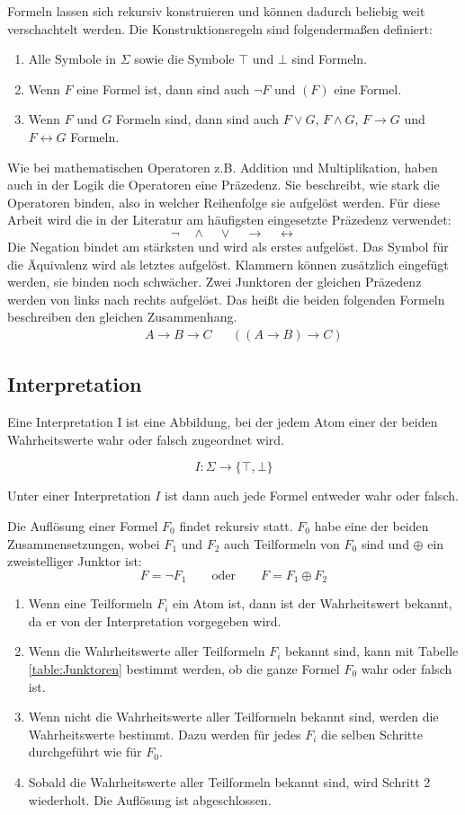Formeln lassen sich rekursiv konstruieren und können dadurch beliebig weit verschachtelt werden. Die Konstruktionsregeln sind folgendermaßen definiert:
\begin{enumerate}
	\item Alle Symbole in $\Sigma$ sowie die Symbole $\top$ und $\bot$ sind Formeln.
	\item Wenn $F$ eine Formel ist, dann sind auch $\neg F$ und $(F)$ eine Formel.
	\item Wenn $F$ und $G$ Formeln sind, dann sind auch $F \vee G$, $F \wedge G$, $F \to G$ und $F \leftrightarrow G$ Formeln.
\end{enumerate}
Wie bei mathematischen Operatoren z.B. Addition und Multiplikation, haben auch in der Logik die Operatoren eine Präzedenz. Sie beschreibt, wie stark die Operatoren binden, also in welcher Reihenfolge sie aufgelöst werden. Für diese Arbeit wird die in der Literatur am häufigsten eingesetzte Präzedenz verwendet:
$$\neg \quad \wedge \quad \vee \quad \to \quad \leftrightarrow$$
Die Negation bindet am stärksten und wird als erstes aufgelöst. Das Symbol für die Äquivalenz wird als letztes aufgelöst. Klammern können zusätzlich eingefügt werden, sie binden noch schwächer.
Zwei Junktoren der gleichen Präzedenz werden von links nach rechts aufgelöst. Das heißt die beiden folgenden Formeln beschreiben den gleichen Zusammenhang.
\begin{align*}
	&& A\to B\to C && ((A\to B)\to C)
\end{align*}
\subsection{Interpretation}

Eine Interpretation I ist eine Abbildung, bei der jedem Atom einer der beiden Wahrheitswerte wahr oder falsch zugeordnet wird. 

$$I: \Sigma\to\{\top,\bot\}$$

Unter einer Interpretation $I$ ist dann auch jede Formel entweder wahr oder falsch.

Die Auflösung einer Formel $F_0$ findet rekursiv statt. $F_0$ habe eine der beiden Zusammensetzungen, wobei $F_1$ und $F_2$ auch Teilformeln von $F_0$ sind und $\oplus$ ein zweistelliger Junktor ist:
$$F=\neg F_1 \quad\quad\text{oder}\quad\quad F=F_1 \oplus F_2$$ 
\begin{enumerate}
	\item Wenn eine Teilformeln $F_i$ ein Atom ist, dann ist der Wahrheitswert bekannt, da er von der Interpretation vorgegeben wird.
	\item Wenn die Wahrheitswerte aller Teilformeln $F_i$ bekannt sind, kann mit Tabelle \ref{table:Junktoren} bestimmt werden, ob die ganze Formel $F_0$ wahr oder falsch ist.
	\item Wenn nicht die Wahrheitswerte aller Teilformeln bekannt sind, werden die Wahrheitswerte bestimmt. Dazu werden für jedes $F_i$ die selben Schritte durchgeführt wie für $F_0$. 
	\item Sobald die Wahrheitswerte aller Teilformeln bekannt sind, wird Schritt 2 wiederholt. Die Auflösung ist abgeschlossen.
\end{enumerate}


